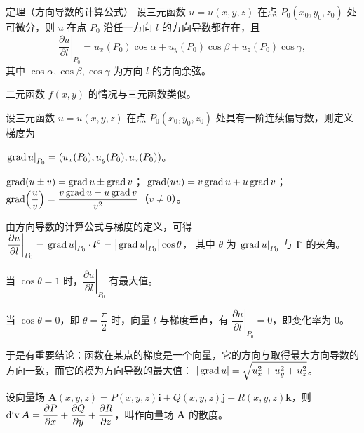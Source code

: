 \begin{theorembox}{定理（方向导数的计算公式）}
设三元函数 $u=u(x,y,z)$ 在点 $P_0(x_0,y_0,z_0)$ 处可微分，则 $u$ 在点 $P_0$ 沿任一方向 $l$ 的方向导数都存在，且
\[
\left.\frac{\partial u}{\partial l}\right|_{P_0}
=u_x(P_0)\cos\alpha+u_y(P_0)\cos\beta+u_z(P_0)\cos\gamma,
\]
其中 $\cos\alpha,\cos\beta,\cos\gamma$ 为方向 $l$ 的方向余弦。
\end{theorembox}

\begin{notebox}
二元函数 $f(x,y)$ 的情况与三元函数类似。
\end{notebox}


\quad 设三元函数 $u=u(x,y,z)$ 在点 $P_0(x_0,y_0,z_0)$ 处具有一阶连续偏导数，则定义梯度为

\noindent$\left.\operatorname{grad} u\right|_{P_0}=(u_x(P_0),u_y(P_0),u_z(P_0))$。

\begin{notebox}
$\operatorname{grad}(u\pm v)=\operatorname{grad} u\pm\operatorname{grad} v$；
$\operatorname{grad}(uv)=v\operatorname{grad} u+u\operatorname{grad} v$；
$\displaystyle \operatorname{grad}\!\left(\frac uv\right)
=\frac{v\operatorname{grad} u-u\operatorname{grad} v}{v^2}$（$v\ne0$）。
\end{notebox}


由方向导数的计算公式与梯度的定义，可得
$\displaystyle \left.\frac{\partial u}{\partial l}\right|_{P_0}
=\left.\operatorname{grad} u\right|_{P_0}\cdot\bm l^\circ
=\left|\left.\operatorname{grad} u\right|_{P_0}\right|\cos\theta$，
其中 $\theta$ 为 $\left.\operatorname{grad} u\right|_{P_0}$ 与 $\bm l^\circ$ 的夹角。

 当 $\cos\theta=1$ 时，$\left.\dfrac{\partial u}{\partial l}\right|_{P_0}$ 有最大值。

 当 $\cos\theta=0$，即 $\theta=\dfrac{\pi}{2}$ 时，向量 $l$ 与梯度垂直，有
$\left.\dfrac{\partial u}{\partial l}\right|_{P_0}=0$，即变化率为 $0$。

于是有重要结论：函数在某点的梯度是一个向量，它的方向与取得最大方向导数的方向一致，而它的模为方向导数的最大值：
$\displaystyle |\operatorname{grad} u|=\sqrt{u_x^2+u_y^2+u_z^2}$。


\quad 设向量场
$\bm A(x,y,z)=P(x,y,z)\bm i+Q(x,y,z)\bm j+R(x,y,z)\bm k$，则
$\displaystyle \operatorname{div}\bm A=\frac{\partial P}{\partial x}
+\frac{\partial Q}{\partial y}
+\frac{\partial R}{\partial z}$，叫作向量场 $\bm A$ 的散度。



